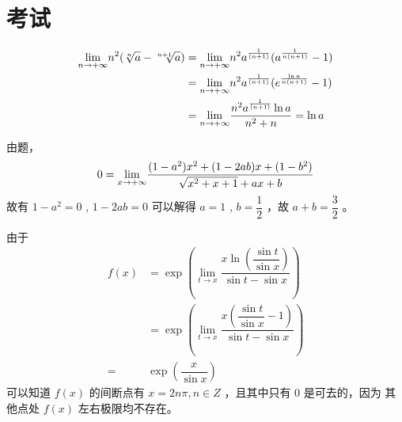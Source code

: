 \section{考试}

\begin{Answer}
    \begin{equation*}
        \begin{aligned}
            \displaystyle {\displaystyle\lim_{n\rightarrow +\infty}}n^2(\sqrt[n]a-\sqrt[n+1]a)
            &= {\displaystyle\lim_{n\rightarrow +\infty}}n^2a^{\frac1{(n+1)}}(a^{\frac1{n(n+1)}}-1)\\ 
            &= {\displaystyle\lim_{n\rightarrow +\infty}}n^2a^{\frac1{(n+1)}}(e^{\frac{\ln a}{n(n+1)}}-1)\\ 
            &= {\displaystyle\lim_{n\rightarrow +\infty}}\frac{n^2a^{\frac1{(n+1)}}\ln a}{n^2+n} = \ln a
        \end{aligned}
    \end{equation*}    
\end{Answer}

\begin{Answer}
    由题，
    $$
       0 =  {\displaystyle\lim_{x\rightarrow +\infty}} 
       \displaystyle\frac{(1-a^2)x^2+(1-2ab)x+(1-b^2)}{\sqrt{x^2+x+1}+ax+b}
    $$ 
    故有 $ 1-a^2 = 0 $ , $ 1-2ab = 0 $ 
    可以解得 $ a=1 $ , $ b = \dfrac{1}{2} $ ，故 $ a+b=\dfrac{3}{2} $ 。
\end{Answer}

\begin{Answer}
    由于
    \begin{equation*}
        \begin{aligned}
            f(x) &= \exp \left({\displaystyle\lim_{t\rightarrow x}}
            \dfrac{x\ln(\dfrac{\sin t}{\sin x})}{\sin t-\sin x}\right)\\ 
            &= \exp \left(\lim_{t\rightarrow x}\dfrac{x(\dfrac{\sin t}{\sin x}-1)}{\sin t-\sin x}\right)\\ 
            =& \exp(\dfrac{x}{\sin x})
        \end{aligned}
    \end{equation*}
    可以知道 $ f(x) $ 的间断点有 $ x = 2n\pi, n\in Z $ ，且其中只有 $ 0 $ 是可去的，因为
    其他点处 $ f(x) $ 左右极限均不存在。
\end{Answer}

